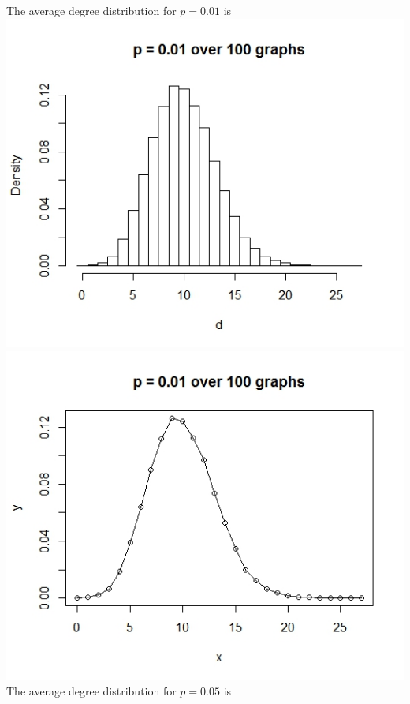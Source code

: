 \documentclass{article}
\begin{document}
The average degree distribution for $p=0.01$ is \\
\includegraphics[scale=0.4]{pa3} \\
\includegraphics[scale=0.4]{pa4} \\
The average degree distribution for $p=0.05$ is \\
\end{document}
